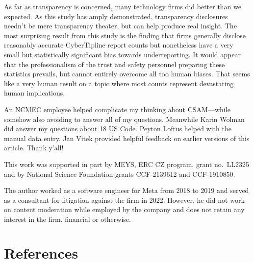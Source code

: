 \documentclass[anonymous,nonacm,screen,12pt]{acmart}
\newcommand\V[1]{{#1}}
\newcommand\V[1]{\textsc{\MakeLowercase{#1}}}
\theoremstyle{definition}
\newif\iftechreport
\newcommand\DirectorsCut[1]{\iftechreport {#1}\fi}
\begin{document}
As far as transparency is concerned, many technology firms did better than we
expected. As this study has amply demonstrated, transparency disclosures needn't
be mere transparency theater, but can help produce real insight. The most
surprising result from this study is the finding that firms generally disclose
reasonably accurate CyberTipline report counts but nonetheless have a very small
but statistically significant bias towards underreporting. It would appear that
the professionalism of the trust and safety personnel preparing these statistics
prevails, but cannot entirely overcome all too human biases. That seems like a
very human result on a topic where most counts represent devastating human
implications.



\begin{anonsuppress}

\begin{acks}
An \V{NCMEC} employee helped complicate my thinking about \V{CSAM}---while
somehow also avoiding to answer all of my questions. Meanwhile Karin Wolman did
answer my questions about 18 \V{US} Code. Peyton Loftus helped with the manual
data entry. Jan Vitek provided helpful feedback on earlier versions of this
article.%
Thank y'all!

This work was supported in part by \V{MEYS}, \V{ERC} \V{CZ} program, grant no.\
LL2325 and by National Science Foundation grants CCF-2139612 and CCF-1910850.
\end{acks}

The author worked as a software engineer for Meta from 2018 to 2019 and served
as a consultant for litigation against the firm in 2022. However, he did not
work on content moderation while employed by the company and does not retain any
interest in the firm, financial or otherwise.

\end{anonsuppress}



\ifdefined\ToWordProcessor
    \section*{References}

    
\else
    
\fi

\DirectorsCut{

\appendix

\section*{CyberTipline Reports by Service Provider}


\section*{Data Provenance}


}
\end{document}
